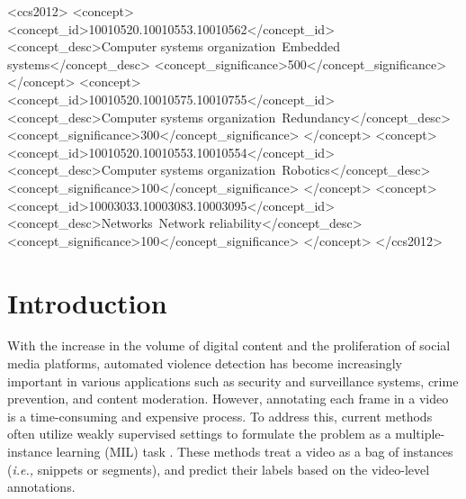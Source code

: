 \documentclass[sigconf]{acmart}
\newcommand{\ie}{{\emph{i.e., }}}
\begin{document}
\begin{CCSXML}
<ccs2012>
 <concept>
  <concept_id>10010520.10010553.10010562</concept_id>
  <concept_desc>Computer systems organization~Embedded systems</concept_desc>
  <concept_significance>500</concept_significance>
 </concept>
 <concept>
  <concept_id>10010520.10010575.10010755</concept_id>
  <concept_desc>Computer systems organization~Redundancy</concept_desc>
  <concept_significance>300</concept_significance>
 </concept>
 <concept>
  <concept_id>10010520.10010553.10010554</concept_id>
  <concept_desc>Computer systems organization~Robotics</concept_desc>
  <concept_significance>100</concept_significance>
 </concept>
 <concept>
  <concept_id>10003033.10003083.10003095</concept_id>
  <concept_desc>Networks~Network reliability</concept_desc>
  <concept_significance>100</concept_significance>
 </concept>
</ccs2012>
\end{CCSXML}












\maketitle

\renewcommand{\thefootnote}{\fnsymbol{footnote}}

\section{Introduction}


With the increase in the volume of digital content and the proliferation of social media platforms, automated violence detection has become increasingly important in various applications such as security and surveillance systems, crime prevention, and content moderation. However, annotating each frame in a video is a time-consuming and expensive process. To address this, current methods often utilize weakly supervised settings to formulate the problem as a multiple-instance learning (MIL) task \cite{c:1,c:2,c:3,c:4,c:5,c:6,c:8,c:13}. These methods treat a video as a bag of instances (\ie snippets or segments), and predict their labels based on the video-level annotations\cite{c:7}. 
\end{document}

